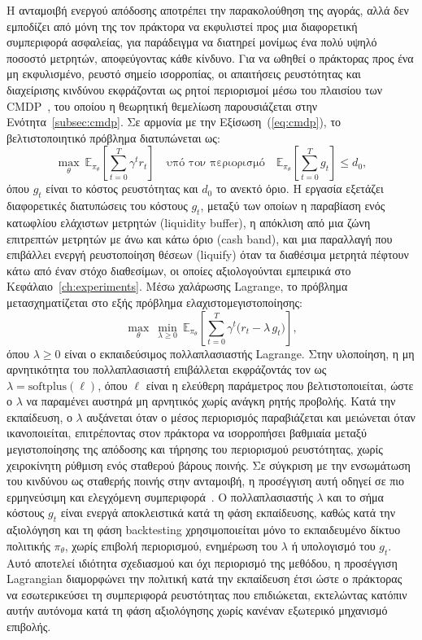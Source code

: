 Η ανταμοιβή ενεργού απόδοσης αποτρέπει την παρακολούθηση της αγοράς, αλλά δεν
εμποδίζει από μόνη της τον πράκτορα να εκφυλιστεί προς μια διαφορετική
συμπεριφορά ασφαλείας, για παράδειγμα να διατηρεί μονίμως ένα πολύ υψηλό
ποσοστό μετρητών, αποφεύγοντας κάθε κίνδυνο. Για να ωθηθεί ο πράκτορας προς
ένα μη εκφυλισμένο, ρευστό σημείο ισορροπίας, οι απαιτήσεις ρευστότητας και
διαχείρισης κινδύνου εκφράζονται ως ρητοί περιορισμοί μέσω του πλαισίου των
CMDP~\cite{altman1999cmdp}, του οποίου η θεωρητική θεμελίωση παρουσιάζεται στην
Ενότητα~\ref{subsec:cmdp}. Σε αρμονία με την Εξίσωση~(\ref{eq:cmdp}), το
βελτιστοποιητικό πρόβλημα διατυπώνεται ως:
\begin{equation}
  \max_{\theta}\ \mathbb{E}_{\pi_\theta}\!\left[\sum_{t=0}^{T}\gamma^{t} r_t\right]
  \quad \text{υπό τον περιορισμό} \quad
  \mathbb{E}_{\pi_\theta}\!\left[\sum_{t=0}^{T} g_t\right] \le d_0,
  \label{eq:cmdp}
\end{equation}
όπου $g_t$ είναι το κόστος ρευστότητας και $d_0$ το ανεκτό όριο. Η εργασία
εξετάζει διαφορετικές διατυπώσεις του κόστους $g_t$, μεταξύ των οποίων η
παραβίαση ενός κατωφλίου ελάχιστων μετρητών (liquidity buffer), η απόκλιση από
μια ζώνη επιτρεπτών μετρητών με άνω και κάτω όριο (cash band), και μια
παραλλαγή που επιβάλλει ενεργή ρευστοποίηση θέσεων (liquify) όταν τα διαθέσιμα
μετρητά πέφτουν κάτω από έναν στόχο διαθεσίμων, οι οποίες αξιολογούνται
εμπειρικά στο Κεφάλαιο~\ref{ch:experiments}. Μέσω χαλάρωσης Lagrange, το
πρόβλημα μετασχηματίζεται στο εξής πρόβλημα ελαχιστομεγιστοποίησης:
\begin{equation}
  \max_{\theta}\ \min_{\lambda \ge 0}\
  \mathbb{E}_{\pi_\theta}\!\left[\sum_{t=0}^{T}\gamma^{t}\bigl(r_t - \lambda\, g_t\bigr)\right],
  \label{eq:lagrangian}
\end{equation}
όπου $\lambda \ge 0$ είναι ο εκπαιδεύσιμος πολλαπλασιαστής Lagrange. Στην
υλοποίηση, η μη αρνητικότητα του πολλαπλασιαστή επιβάλλεται εκφράζοντάς τον ως
$\lambda = \mathrm{softplus}(\ell)$, όπου $\ell$ είναι η ελεύθερη παράμετρος
που βελτιστοποιείται, ώστε ο $\lambda$ να παραμένει αυστηρά μη αρνητικός χωρίς
ανάγκη ρητής προβολής. Κατά την εκπαίδευση, ο $\lambda$ αυξάνεται όταν ο μέσος
περιορισμός παραβιάζεται και μειώνεται όταν ικανοποιείται, επιτρέποντας στον
πράκτορα να ισορροπήσει βαθμιαία μεταξύ μεγιστοποίησης της απόδοσης και
τήρησης του περιορισμού ρευστότητας, χωρίς χειροκίνητη ρύθμιση ενός σταθερού
βάρους ποινής. Σε σύγκριση με την ενσωμάτωση του κινδύνου ως σταθερής ποινής
στην ανταμοιβή, η προσέγγιση αυτή οδηγεί σε πιο ερμηνεύσιμη και ελεγχόμενη
συμπεριφορά~\cite{achiam2017cpo,tessler2018rcpo}.
Ο πολλαπλασιαστής $\lambda$ και το σήμα κόστους $g_t$ είναι ενεργά αποκλειστικά κατά
τη φάση εκπαίδευσης, καθώς κατά την αξιολόγηση και τη φάση backtesting χρησιμοποιείται
μόνο το εκπαιδευμένο δίκτυο πολιτικής $\pi_\theta$, χωρίς επιβολή περιορισμού,
ενημέρωση του $\lambda$ ή υπολογισμό του $g_t$. 
Αυτό αποτελεί ιδιότητα σχεδιασμού και όχι περιορισμό της μεθόδου, η προσέγγιση
Lagrangian διαμορφώνει την πολιτική κατά την εκπαίδευση έτσι ώστε ο πράκτορας
να εσωτερικεύσει τη συμπεριφορά ρευστότητας που επιδιώκεται, εκτελώντας κατόπιν
αυτήν αυτόνομα κατά τη φάση αξιολόγησης χωρίς κανέναν εξωτερικό μηχανισμό
επιβολής.

